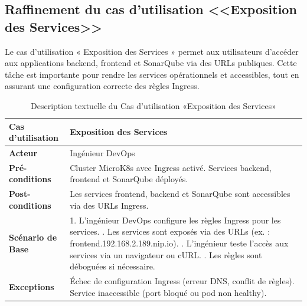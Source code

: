   \subsection{Raffinement du cas d'utilisation <<Exposition des Services>>}
  Le cas d’utilisation « Exposition des Services » permet aux utilisateurs d’accéder aux applications backend, frontend et SonarQube via des URLs publiques. Cette tâche est importante pour rendre les services opérationnels et accessibles, tout en assurant une configuration correcte des règles Ingress.
  \begin{table}[!ht]
      \centering
      \caption{Description textuelle du Cas d’utilisation «Exposition des Services»}
      \label{tab:exposition_services}
      \renewcommand{\arraystretch}{1.2}
      \begin{tabular}{|p{4.2cm}|p{11cm}|}
      \hline
      \textbf{Cas d'utilisation} & Exposition des Services \\
      \hline
      \textbf{Acteur} & Ingénieur DevOps \\
      \hline
      \textbf{Pré-conditions} & Cluster MicroK8s avec Ingress activé. \newline Services backend, frontend et SonarQube déployés. \\
      \hline
      \textbf{Post-conditions} & Les services frontend, backend et SonarQube sont accessibles via des URLs Ingress. \\
      \hline
      \textbf{Scénario de Base} & 
      1. L’ingénieur DevOps configure les règles Ingress pour les services. \newline
      2. Les services sont exposés via des URLs (ex. : frontend.192.168.2.189.nip.io). \newline
      3. L’ingénieur teste l’accès aux services via un navigateur ou cURL. \newline
      4. Les règles sont déboguées si nécessaire. \\
      \hline
      \textbf{Exceptions} & 
      Échec de configuration Ingress (erreur DNS, conflit de règles). \newline Service inaccessible (port bloqué ou pod non healthy). \\
      \hline
      \end{tabular}
  \end{table}
